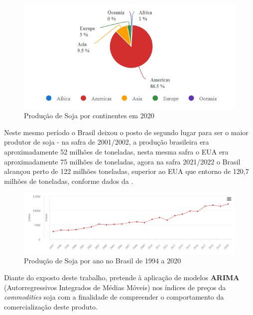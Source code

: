 \documentclass[
	12pt,				%
	openright,			%
	oneside,      %
	a4paper,			%
	english,			%
	french,				%
	spanish,			%
	brazil,				%
	]{abntex2}\usepackage[]{graphicx}\usepackage[table]{xcolor}
\theoremstyle{definition}
\theoremstyle{remark}
\begin{document}
\begin{figure}
  \caption{\label{imagen1}Produção de Soja por continentes em 2020}
    \begin{center}
      \includegraphics[width=12cm]{image/img1.png}
    \end{center}
\end{figure}


Neste mesmo período o Brasil deixou o posto de segundo lugar para ser o maior produtor de soja - na safra de 2001/2002, a produção brasileira era aproximadamente 52 milhões de toneladas, nesta mesma safra o EUA era aproximadamente 75 milhões de toneladas, agora na safra 2021/2022 o Brasil alcançou perto de 122 milhões toneladas, superior ao EUA que entorno de 120,7 milhões de toneladas, conforme dados da \cite{conab2022}.

\begin{figure}
  \caption{\label{imagen2}Produção de Soja por ano no Brasil de 1994 a 2020}
    \begin{center}
      \includegraphics[scale = 0.7]{image/img2.png}
    \end{center}
\end{figure}


Diante do exposto deste trabalho, pretende à aplicação de modelos \textbf{ARIMA} (Autorregressivos Integrados de Médias Móveis) nos índices de preços da \textit{commodities} soja com a finalidade de compreender o comportamento da 
comercialização deste produto.
\end{document}
